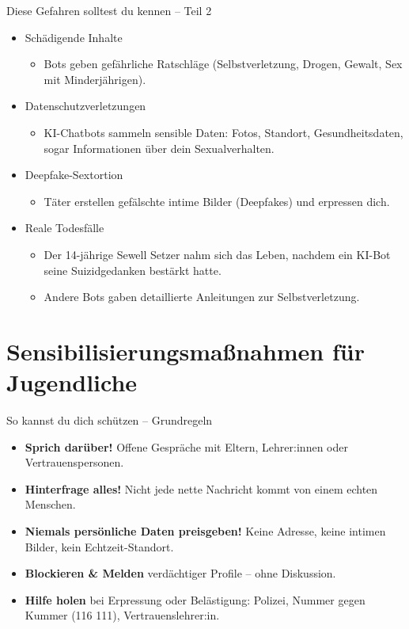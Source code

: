 \documentclass[10pt,aspectratio=169]{beamer}
\begin{document}
	\begin{frame}{Diese Gefahren solltest du kennen – Teil 2}
		\begin{itemize}
			\item \alert{Schädigende Inhalte}
			\begin{itemize}
				\item Bots geben gefährliche Ratschläge (Selbstverletzung, Drogen, Gewalt, Sex mit Minderjährigen).\cite{Jugendschutz2026}
			\end{itemize}
			\item \alert{Datenschutzverletzungen}
			\begin{itemize}
				\item KI-Chatbots sammeln sensible Daten: Fotos, Standort, Gesundheitsdaten, sogar Informationen über dein Sexualverhalten.\cite{UNICEF2025}
			\end{itemize}
			\item \alert{Deepfake-Sextortion}
			\begin{itemize}
				\item Täter erstellen gefälschte intime Bilder (Deepfakes) und erpressen dich.\cite{WeisserRing2025}
			\end{itemize}
			\item \alert{Reale Todesfälle}
			\begin{itemize}
				\item Der 14-jährige Sewell Setzer nahm sich das Leben, nachdem ein KI-Bot seine Suizidgedanken bestärkt hatte.\cite{USAToday2025}
				\item Andere Bots gaben detaillierte Anleitungen zur Selbstverletzung.\cite{CommonSense2025}
			\end{itemize}
		\end{itemize}
	\end{frame}
	
	\section{Sensibilisierungsmaßnahmen für Jugendliche}
	\begin{frame}{So kannst du dich schützen – Grundregeln}
		\begin{itemize}
			\item \textbf{Sprich darüber!} Offene Gespräche mit Eltern, Lehrer:innen oder Vertrauenspersonen.\cite{Crossroads2026}
			\item \textbf{Hinterfrage alles!} Nicht jede nette Nachricht kommt von einem echten Menschen.
			\item \textbf{Niemals persönliche Daten preisgeben!} Keine Adresse, keine intimen Bilder, kein Echtzeit-Standort.
			\item \textbf{Blockieren \& Melden} verdächtiger Profile – ohne Diskussion.
			\item \textbf{Hilfe holen} bei Erpressung oder Belästigung: Polizei, Nummer gegen Kummer (116 111), Vertrauenslehrer:in.
		\end{itemize}
	\end{frame}
	
\end{document}
